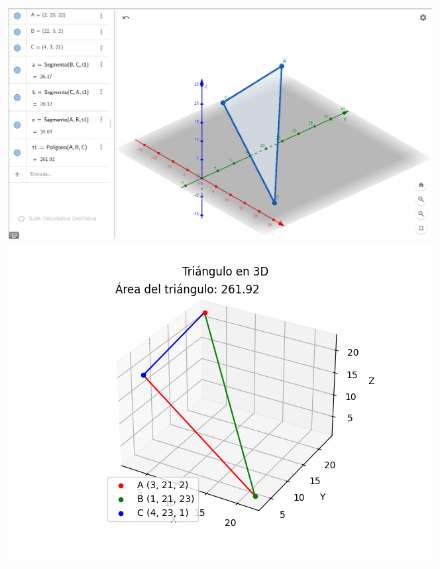 \documentclass{article}
\begin{document}
\begin{figure}[h!]
    \begin{minipage}{0.45\textwidth}
        \centering
        \includegraphics[width=\textwidth]{imgs/triangulo_B_Geogebra.png}
    \end{minipage}
    \hfill
    \begin{minipage}{0.45\textwidth}
        \centering
        \includegraphics[width=\textwidth]{imgs/triangulo_B_python.png}
    \end{minipage}
    
    \vspace{0.5cm}
    

\end{figure}
\end{document}
